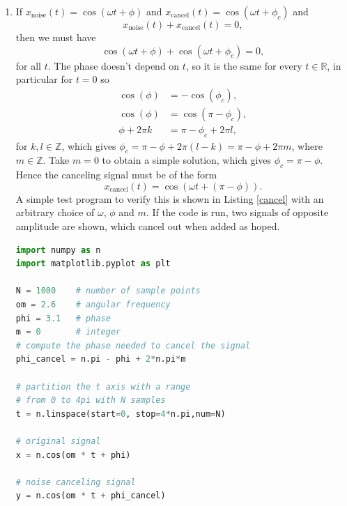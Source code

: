 \newpage

\begin{enumerate}
\item If $x_{\text{noise}}(t)=\cos(\omega t+\phi)$ and $x_{\text{cancel}}(t)=\cos(\omega t+\phi_{c})$ and
$$x_{\text{noise}}(t)+x_{\text{cancel}}(t)=0,$$
then we must have
$$\cos(\omega t+\phi)+\cos(\omega t+\phi_{c})=0,$$
for all $t$. The phase doesn't depend on $t$, so it is the same for every $t\in\mathbb{R}$, in particular for $t=0$ so
\begin{align*}
    \cos(\phi)&=-\cos(\phi_{c}), \\
    \cos(\phi)&=\cos(\pi -\phi_{c}), \\
    \phi+2\pi k&=\pi-\phi_{c}+2\pi l,
\end{align*}
for $k,l\in\mathbb{Z}$, which gives $\phi_{c}=\pi-\phi+2\pi(l-k)=\pi-\phi+2\pi m$, where $m\in\mathbb{Z}$. Take $m=0$ to obtain a simple solution, which gives $\phi_{c}=\pi -\phi$.
Hence the canceling signal must be of the form
$$x_{\text{cancel}}(t)=\cos(\omega t+(\pi-\phi)).$$
A simple test program to verify this is shown in Listing \ref{cancel} with an arbitrary choice of $\omega$, $\phi$ and $m$. If the code is run, two signals of opposite amplitude are shown, which cancel out when added as hoped. 

\begin{lstlisting}[language=Python, caption=Noise canceling signal,label=cancel]
import numpy as n
import matplotlib.pyplot as plt

N = 1000    # number of sample points
om = 2.6    # angular frequency
phi = 3.1   # phase
m = 0       # integer
# compute the phase needed to cancel the signal
phi_cancel = n.pi - phi + 2*n.pi*m    

# partition the t axis with a range 
# from 0 to 4pi with N samples
t = n.linspace(start=0, stop=4*n.pi,num=N)

# original signal
x = n.cos(om * t + phi)

# noise canceling signal
y = n.cos(om * t + phi_cancel)


\end{lstlisting}
\end{enumerate}
